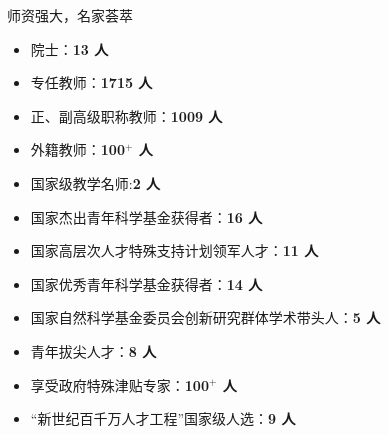 \documentclass[aspectratio=169, utf8]{beamer}
\begin{document}
\begin{frame}{师资强大，名家荟萃}
    \begin{multicols}{2}
        \begin{itemize}
            \item 院士：\textcolor{Fore}{\textbf{13 人}}
            \item 专任教师：\textcolor{Fore}{\textbf{1715 人}}
            \item 正、副高级职称教师：\textcolor{Fore}{\textbf{1009 人}}
            \item 外籍教师：\textcolor{Fore}{\textbf{100$^+$ 人}}
            \item 国家级教学名师:\textcolor{Fore}{\textbf{2 人}}
            \item 国家杰出青年科学基金获得者：\textcolor{Fore}{\textbf{16 人}}
            \item 国家高层次人才特殊支持计划领军人才：\textcolor{Fore}{\textbf{11 人}}
            \item 国家优秀青年科学基金获得者：\textcolor{Fore}{\textbf{14 人}}
            \item 国家自然科学基金委员会创新研究群体学术带头人：\textcolor{Fore}{\textbf{5 人}}
            \item 青年拔尖人才：\textcolor{Fore}{\textbf{8 人}}
            \item 享受政府特殊津贴专家：\textcolor{Fore}{\textbf{100$^+$ 人}}
            \item “新世纪百千万人才工程”国家级人选：\textcolor{Fore}{\textbf{9 人}}
        \end{itemize}
    \end{multicols}
\end{frame}
\end{document}
